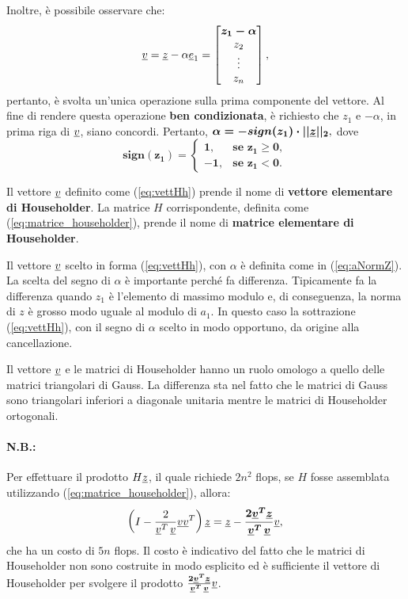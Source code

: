 Inoltre, è possibile osservare che:
\begin{equation*}
    \uline v= \uline z -\alpha\uline e_1 = 
    \begin{bmatrix}
        \boldsymbol{z_1 - \alpha}\\
        z_2\\
        \vdots\\
        z_n
    \end{bmatrix},
\end{equation*}
pertanto, è svolta un'unica operazione sulla prima componente del vettore. Al fine di rendere questa operazione \textbf{ben condizionata}, è richiesto che $z_1$ e $-\alpha$, in prima riga di $\uline v$, siano concordi. Pertanto, $\boldsymbol{\alpha=-sign(z_1)\cdot||\uline z||_2},$ dove
\begin{equation*}
    \boldsymbol{sign(z_1)=
    \begin{cases}
        1, &\text{se } z_1\geq 0,\\
        -1, & \text{se } z_1<0.
    \end{cases}}
\end{equation*}

\begin{definition}
    Il vettore $\uline v$ definito come (\ref{eq:vettHh}) prende il nome di \textbf{vettore elementare di Householder}. La matrice $H$ corrispondente, definita come (\ref{eq:matrice_householder}), prende il nome di \textbf{matrice elementare di Householder}.
\end{definition}

Il vettore $\uline v$ scelto in forma (\ref{eq:vettHh}), con $\alpha$ è definita come in (\ref{eq:aNormZ}). La scelta del segno di $\alpha$ è importante perché fa differenza. Tipicamente fa la differenza quando $z_1$ è l'elemento di massimo modulo e, di conseguenza, la norma di $z$ è grosso modo uguale al modulo di $a_1$. In questo caso la sottrazione (\ref{eq:vettHh}), con il segno di $\alpha$ scelto in modo opportuno, da origine alla cancellazione.

Il vettore $\uline v$ e le matrici di Householder hanno un ruolo omologo a quello delle matrici triangolari di Gauss. La differenza sta nel fatto che le matrici di Gauss sono triangolari inferiori a diagonale unitaria mentre le matrici di Householder ortogonali.

\paragraph{N.B.:} Per effettuare il prodotto $H\uline z$, il quale richiede $2n^2$ flops, se $H$ fosse assemblata utilizzando (\ref{eq:matrice_householder}), allora: 
\begin{equation*}
    \left(I-\frac{2}{\uline v^T\,\uline v}\uline v\uline v^T\right)\uline z=\uline z-\boldsymbol{\frac{2\uline v^T\uline z}{\uline v^T\,\uline v}}\uline v,
\end{equation*}
che ha un costo di $5n$ flops. Il costo è indicativo del fatto che le matrici di Householder non sono costruite in modo esplicito ed è sufficiente il vettore di Householder per svolgere il prodotto $\boldsymbol{\frac{2\uline v^T\uline z}{\uline v^T\,\uline v}}\uline v$.

